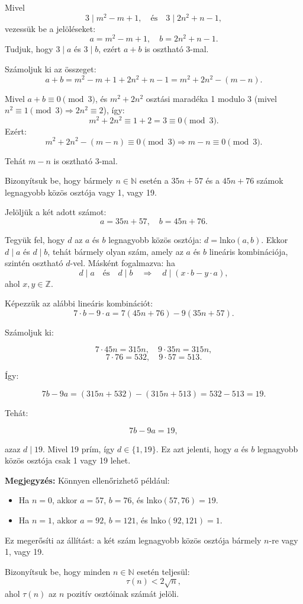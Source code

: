 \begin{solution}
Mivel 
\[
3\mid m^{2}-m+1,\quad\text{és}\quad3\mid2n^{2}+n-1,
\]
vezessük be a jelöléseket: 
\[
a=m^{2}-m+1,\quad b=2n^{2}+n-1.
\]
Tudjuk, hogy $3\mid a$ és $3\mid b$, ezért $a+b$ is osztható 3-mal.

Számoljuk ki az összeget: 
\[
a+b=m^{2}-m+1+2n^{2}+n-1=m^{2}+2n^{2}-(m-n).
\]

Mivel $a+b\equiv0\pmod 3$, és $m^{2}+2n^{2}$ osztási maradéka 1
modulo 3 (mivel $n^{2}\equiv1\pmod 3\Rightarrow2n^{2}\equiv2$), így:
\[
m^{2}+2n^{2}\equiv1+2=3\equiv0\pmod 3.
\]
Ezért: 
\[
m^{2}+2n^{2}-(m-n)\equiv0\pmod 3\Rightarrow m-n\equiv0\pmod 3.
\]

Tehát $m-n$ is osztható 3-mal. 
\end{solution}
\begin{problem}
Bizonyítsuk be, hogy bármely $n\in\mathbb{N}$ esetén a $35n+57$
és a $45n+76$ számok legnagyobb közös osztója vagy 1, vagy 19. 
\end{problem}

\begin{solution}
Jelöljük a két adott számot: 
\[
a=35n+57,\quad b=45n+76.
\]

Tegyük fel, hogy $d$ az $a$ és $b$ legnagyobb közös osztója: $d=\mathrm{lnko}(a,b)$.
Ekkor $d\mid a$ és $d\mid b$, tehát bármely olyan szám, amely az
$a$ és $b$ lineáris kombinációja, szintén osztható $d$-vel. Másként
fogalmazva: ha 
\[
d\mid a\quad\text{és}\quad d\mid b\quad\Rightarrow\quad d\mid(x\cdot b-y\cdot a),
\]
ahol $x,y\in\mathbb{Z}$.

Képezzük az alábbi lineáris kombinációt: 
\[
7\cdot b-9\cdot a=7(45n+76)-9(35n+57).
\]

Számoljuk ki:

\[
7\cdot45n=315n,\quad9\cdot35n=315n,
\]
\[
7\cdot76=532,\quad9\cdot57=513.
\]

Így:

\[
7b-9a=(315n+532)-(315n+513)=532-513=19.
\]

Tehát:

\[
7b-9a=19,
\]

azaz $d\mid19$. Mivel 19 prím, így $d\in\{1,19\}$. Ez azt jelenti,
hogy $a$ és $b$ legnagyobb közös osztója csak 1 vagy 19 lehet.

\textbf{Megjegyzés:} Könnyen ellenőrizhető például: 
\begin{itemize}
\item Ha $n=0$, akkor $a=57$, $b=76$, és $\mathrm{lnko}(57,76)=19$. 
\item Ha $n=1$, akkor $a=92$, $b=121$, és $\mathrm{lnko}(92,121)=1$. 
\end{itemize}
Ez megerősíti az állítást: a két szám legnagyobb közös osztója bármely
$n$-re vagy 1, vagy 19.
\end{solution}
\begin{problem}
Bizonyítsuk be, hogy minden $n\in\mathbb{N}$ esetén teljesül: 
\[
\tau(n)<2\sqrt{n},
\]
ahol $\tau(n)$ az $n$ pozitív osztóinak számát jelöli. 
\end{problem}

